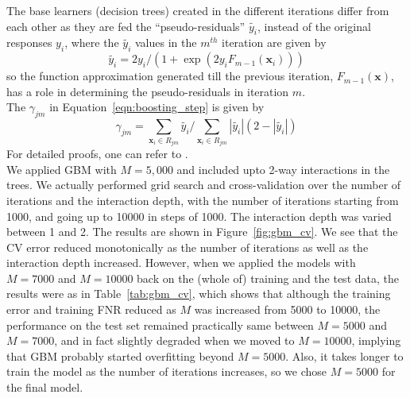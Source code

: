 The base learners (decision trees) created in the different iterations differ from each other as they are fed the ``pseudo-residuals'' $\tilde{y_i}$, instead of the original responses $y_i$, where the $\tilde{y_i}$ values in the $m^{th}$ iteration are given by 
\begin{equation}
\label{eqn:pseudo_residual}
\tilde{y_i} = 2y_i/(1 + \exp(2y_iF_{m-1}({\mathbf{x}}_i))) 
\end{equation}
so the function approximation generated till the previous iteration, $F_{m-1}(\mathbf{x})$, has a role in determining the pseudo-residuals in iteration $m$.\\

The ${\gamma}_{jm}$ in Equation~\ref{eqn:boosting_step} is given by 
\begin{equation}
\label{eqn:gamma_jm}
{\gamma}_{jm} = \sum_{{\mathbf{x}}_i \in R_{jm}}\tilde{y_i}\big/\sum_{{\mathbf{x}}_i \in R_{jm}}|\tilde{y_i}|(2-|\tilde{y_i}|)
\end{equation}
For detailed proofs, one can refer to \cite{Friedman01}.\\

We applied GBM with $M = 5,000$ and included upto 2-way interactions in the trees. We actually performed grid search and cross-validation over the number of iterations and the interaction depth, with the number of iterations starting from 1000, and going up to 10000 in steps of 1000. The interaction depth was varied between 1 and 2. The results are shown in Figure~\ref{fig:gbm_cv}. We see that the CV error reduced monotonically as the number of iterations as well as the interaction depth increased. However, when we applied the models with $M = 7000$ and $M = 10000$ back on the (whole of) training and the test data, the results were as in Table~\ref{tab:gbm_cv}, which shows that although the training error and training FNR reduced as $M$ was increased from 5000 to 10000, the performance on the test set remained practically same between $M = 5000$ and $M = 7000$, and in fact slightly degraded when we moved to $M = 10000$, implying that GBM probably started overfitting beyond $M = 5000$. Also, it takes longer to train the model as the number of iterations increases, so we chose $M = 5000$ for the final model.\\


